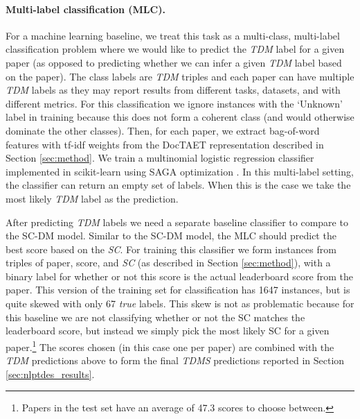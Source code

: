 \documentclass[11pt,a4paper]{article}
\begin{document}
\paragraph{Multi-label classification (MLC).}
For a machine learning baseline, we treat this task as a multi-class, multi-label classification problem where we would like to predict the \emph{TDM} label for a given paper (as opposed to predicting whether we can infer a given \emph{TDM} label based on the paper).
The class labels are \emph{TDM} triples and each paper can have multiple \emph{TDM} labels as they may report results from different tasks, datasets, and with different metrics.
For this classification we ignore instances with the `Unknown' label in training because this does not form a coherent class (and would otherwise dominate the other classes).
Then, for each paper, we extract bag-of-word features with tf-idf weights from the DocTAET representation described in Section \ref{sec:method}.
We train a multinomial logistic regression classifier implemented in scikit-learn \cite{scikit-learn}
using SAGA optimization \cite{defazio:etal:14}.
In this multi-label setting, the classifier can return an empty set of labels.
When this is the case we take the most likely \emph{TDM} label as the prediction.

After predicting \emph{TDM} labels we need a separate baseline classifier to compare to the SC-DM model.
Similar to the SC-DM model, the MLC should predict the best score based on the \emph{SC}.
For training this classifier we form instances from triples of paper, score, and \emph{SC} (as described in Section \ref{sec:method}), with a binary label for whether or not this score is the actual leaderboard score from the paper.
This version of the training set for classification has 1647 instances, but is quite skewed with only 67 \emph{true} labels.
This skew is not as problematic because for this baseline we are not classifying whether or not the SC matches the leaderboard score, but instead we simply pick the most likely SC for a given paper.\footnote{Papers in the test set have an average of 47.3 scores to choose between.}
The scores chosen (in this case one per paper) are combined with the \emph{TDM} predictions above to form the final \emph{TDMS} predictions reported in Section \ref{sec:nlptdes_results}. 
\end{document}
